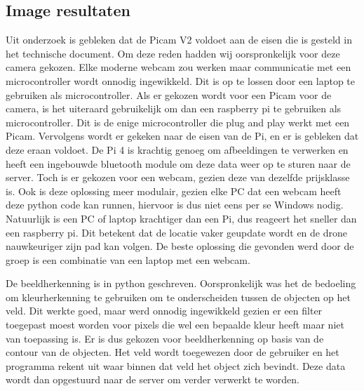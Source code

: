 \subsection{Image resultaten}
Uit onderzoek is gebleken dat de Picam V2 voldoet aan de eisen die is gesteld in het technische document. Om deze reden hadden wij oorspronkelijk voor deze camera gekozen. Elke moderne webcam zou werken maar communicatie met een microcontroller wordt onnodig ingewikkeld. Dit is op te lossen door een laptop te gebruiken als microcontroller. Als er gekozen wordt voor een Picam voor de camera, is het uiteraard gebruikelijk om dan een raspberry pi te gebruiken als microcontroller. Dit is de enige microcontroller die plug and play werkt met een Picam. Vervolgens wordt er gekeken naar de eisen van de Pi, en er is gebleken dat deze eraan voldoet. De Pi 4 is krachtig genoeg om afbeeldingen te verwerken en heeft een ingebouwde bluetooth module om deze data weer op te sturen naar de server. Toch is er gekozen voor een webcam, gezien deze van dezelfde prijsklasse is. Ook is deze oplossing meer modulair, gezien elke PC dat een webcam heeft deze python code kan runnen, hiervoor is dus niet eens per se Windows nodig. Natuurlijk is een PC of laptop krachtiger dan een Pi, dus reageert het sneller dan een raspberry pi. Dit betekent dat de locatie vaker geupdate wordt en de drone nauwkeuriger zijn pad kan volgen. De beste oplossing die gevonden werd door de groep is een combinatie van een laptop met een webcam.

De beeldherkenning is in python geschreven. Oorspronkelijk was het de bedoeling om kleurherkenning te gebruiken om te onderscheiden tussen de objecten op het veld. Dit werkte goed, maar werd onnodig ingewikkeld gezien er een filter toegepast moest worden voor pixels die wel een bepaalde kleur heeft maar niet van toepassing is. Er is dus gekozen voor beeldherkenning op basis van de contour van de objecten. Het veld wordt toegewezen door de gebruiker en het programma rekent uit waar binnen dat veld het object zich bevindt. Deze data wordt dan opgestuurd naar de server om verder verwerkt te worden.


